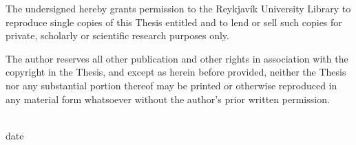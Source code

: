 \thispagestyle{empty}%
\singlespacing%
\setlength{\parindent}{0pt}%
\setlength{\parskip}{\baselineskip}%


The undersigned hereby grants permission to the Reykjavík University Library to reproduce single copies of this Thesis entitled \textbf{\thesisTitle{}} and to lend or sell such copies for private, scholarly or scientific research purposes only.\par

The author reserves all other publication and other rights in association with the copyright in the Thesis, and except as herein before provided, neither the Thesis nor any substantial portion thereof may be printed or otherwise reproduced in any material form whatsoever without the author's prior written permission.\par

\vspace{3\baselineskip}

\noindent
{}\\
date\par

\vspace{2.5\baselineskip}

\noindent
{}\\
\thesisAuthor\\
\thesisDegreeLong{}\par


